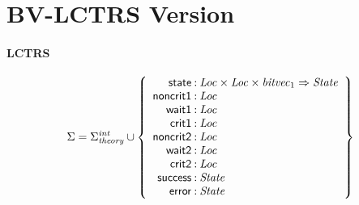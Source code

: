 \documentclass[a4paper]{article}
\newcommand{\Sort}[1]{\mathit{#1}}
\newcommand{\symb}[1]{\mathsf{#1}}
\newcommand{\Sigmainttheory}{\Sigma^{\mathit{int}}_{\mathit{theory}}}
\begin{document}
\newpage
\section*{BV-LCTRS Version}


\paragraph{LCTRS}

\[
\Sigma = 
\Sigmainttheory \cup\left\{
\begin{array}{r@{\>}c@{\>}l}
\symb{state} & : & \Sort{Loc} \times \Sort{Loc} \times \Sort{bitvec}_{1} \Rightarrow \Sort{State}\\
\symb{noncrit1} & : & \Sort{Loc}\\
\symb{wait1} & : & \Sort{Loc}\\
\symb{crit1} & : & \Sort{Loc}\\
\symb{noncrit2} & : & \Sort{Loc}\\
\symb{wait2} & : & \Sort{Loc}\\
\symb{crit2} & : & \Sort{Loc}\\
\symb{success} & : & \Sort{State}\\
\symb{error} & : & \Sort{State}\\
\end{array}
\right\}
\]
\end{document}
